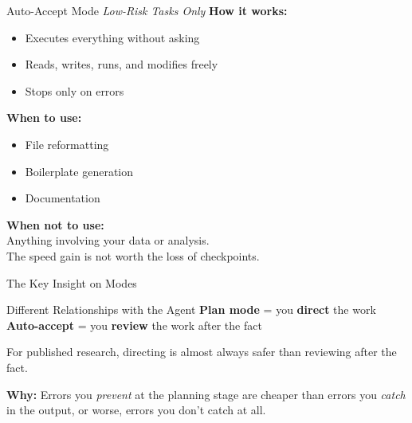 \documentclass[aspectratio=169, 11pt]{beamer}
\begin{document}
\begin{frame}{Auto-Accept Mode \hfill \normalsize\textit{Low-Risk Tasks Only}}
  \textbf{How it works:}
  \begin{itemize}
    \item Executes everything without asking
    \item Reads, writes, runs, and modifies freely
    \item Stops only on errors
  \end{itemize}

  \vspace{0.5em}
  \textbf{When to use:}
  \begin{itemize}
    \item File reformatting
    \item Boilerplate generation
    \item Documentation
  \end{itemize}

  \vspace{0.5em}
  \textbf{When \alert{not} to use:}\\
  Anything involving your data or analysis.\\
  The speed gain is not worth the loss of checkpoints.
\end{frame}

\begin{frame}{The Key Insight on Modes}
  \begin{alertblock}{Different Relationships with the Agent}
    \textbf{Plan mode} = you \textbf{direct} the work\\
    \textbf{Auto-accept} = you \textbf{review} the work after the fact
  \end{alertblock}

  \vspace{0.8em}
  For published research, directing is almost always safer than reviewing after the fact.

  \vspace{0.5em}
  \textbf{Why:} Errors you \textit{prevent} at the planning stage are cheaper than errors you \textit{catch} in the output, or worse, errors you don't catch at all.
\end{frame}

\end{document}
